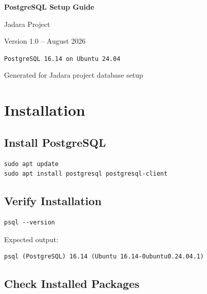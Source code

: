 \documentclass[11pt,a4paper]{article}
\begin{document}
\begin{titlepage}
\centering
\vspace*{2cm}
{\Huge\bfseries PostgreSQL Setup Guide\par}
\vspace{1cm}
{\Large Jadara Project\par}
\vspace{2cm}
{\large Version 1.0 -- August 2026\par}
\vspace{3cm}
{\large\texttt{PostgreSQL 16.14 on Ubuntu 24.04}\par}
\vfill
{\small Generated for Jadara project database setup\par}
\end{titlepage}

\tableofcontents
\newpage

\section{Installation}

\subsection{Install PostgreSQL}

\begin{lstlisting}[style=shell]
sudo apt update
sudo apt install postgresql postgresql-client
\end{lstlisting}

\subsection{Verify Installation}

\begin{lstlisting}[style=shell]
psql --version
\end{lstlisting}

Expected output:
\begin{lstlisting}[style=shell]
psql (PostgreSQL) 16.14 (Ubuntu 16.14-0ubuntu0.24.04.1)
\end{lstlisting}

\subsection{Check Installed Packages}
\end{document}

